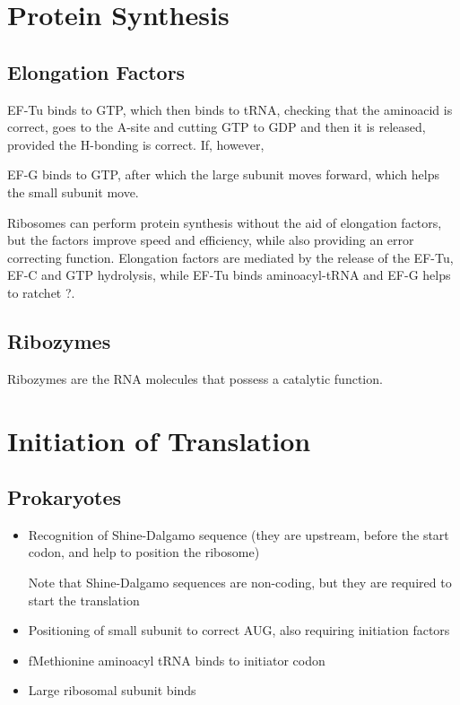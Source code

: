 \documentclass[11pt]{scrartcl}
\begin{document}
\section{Protein Synthesis}

\subsection{Elongation Factors}

EF-Tu binds to GTP, which then binds to tRNA, checking that the aminoacid is correct, goes to the A-site and cutting GTP to GDP and then it is released, provided the H-bonding is correct. If, however,

EF-G binds to GTP, after which the large subunit moves forward, which helps the small subunit move.

Ribosomes can perform protein synthesis without the aid of elongation factors, but the factors improve speed and efficiency, while also providing an error correcting function. Elongation factors are mediated by the release of the EF-Tu, EF-C and GTP hydrolysis, while EF-Tu binds aminoacyl-tRNA and EF-G helps to ratchet ?.

\subsection{Ribozymes}

Ribozymes are the RNA molecules that possess a catalytic function.

\section{Initiation of Translation}

\subsection{Prokaryotes}

\begin{itemize}
\item Recognition of Shine-Dalgamo sequence (they are upstream, before the start codon, and help to position the ribosome)

  Note that Shine-Dalgamo sequences are non-coding, but they are required to start the translation
  
\item Positioning of small subunit to correct AUG, also requiring initiation factors
\item fMethionine aminoacyl tRNA binds to initiator codon
\item Large ribosomal subunit binds
\end{itemize}
\end{document}
